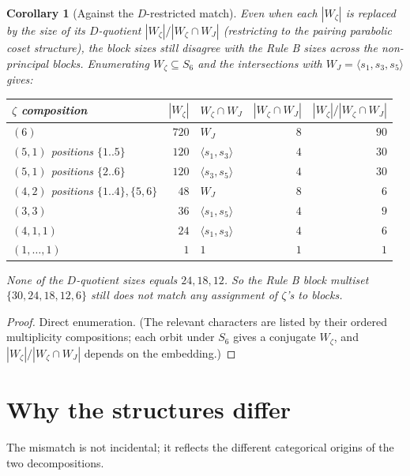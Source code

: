 \documentclass[11pt]{article}
\newtheorem{corollary}[theorem]{Corollary}
\theoremstyle{definition}
\begin{document}
\begin{corollary}[Against the $D$-restricted match]\label{cor:d-restricted}
Even when each $|W_\zeta|$ is replaced by the size of its $D$-quotient
$|W_\zeta| / |W_\zeta \cap W_J|$ (restricting to the pairing parabolic coset
structure), the block sizes still disagree with the Rule B sizes across the
non-principal blocks. Enumerating $W_\zeta \subseteq S_6$ and the intersections with
$W_J = \langle s_1, s_3, s_5\rangle$ gives:
\begin{center}
\begin{tabular}{l|r|l|r|r}
$\zeta$ composition & $|W_\zeta|$ & $W_\zeta \cap W_J$ & $|W_\zeta \cap W_J|$ & $|W_\zeta|/|W_\zeta \cap W_J|$ \\
\hline
$(6)$ & $720$ & $W_J$ & $8$ & $90$ \\
$(5,1)$ positions $\{1..5\}$& $120$ & $\langle s_1, s_3\rangle$ & $4$ & $30$ \\
$(5,1)$ positions $\{2..6\}$& $120$ & $\langle s_3, s_5\rangle$ & $4$ & $30$ \\
$(4,2)$ positions $\{1..4\},\{5,6\}$& $48$ & $W_J$ & $8$ & $6$ \\
$(3,3)$ & $36$ & $\langle s_1, s_5\rangle$ & $4$ & $9$ \\
$(4,1,1)$ & $24$ & $\langle s_1, s_3\rangle$ & $4$ & $6$ \\
$(1,\ldots,1)$ & $1$ & $1$ & $1$ & $1$ \\
\end{tabular}
\end{center}
None of the $D$-quotient sizes equals $24, 18, 12$. So the Rule B block multiset
$\{30, 24, 18, 12, 6\}$ still does not match any assignment of $\zeta$'s to blocks.
\end{corollary}

\begin{proof}
Direct enumeration. (The relevant characters are listed by their ordered multiplicity
compositions; each orbit under $S_6$ gives a conjugate $W_\zeta$, and
$|W_\zeta|/|W_\zeta \cap W_J|$ depends on the embedding.)
\end{proof}

\section{Why the structures differ}

The mismatch is not incidental; it reflects the different categorical origins of the
two decompositions.
\end{document}
